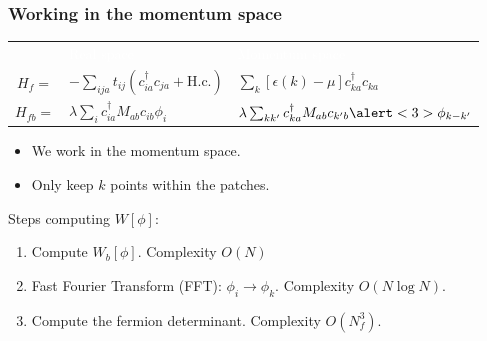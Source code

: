 \documentclass[xcolor=table, 10pt, aspectratio=43]{beamer}
\renewcommand{\arraystretch}{1.5}
\begin{document}
\begin{frame}
  \frametitle{Working in the momentum space}
  \begin{table}
    \renewcommand{\arraystretch}{2.5}
  \begin{tabularx}{\columnwidth}{cxx}
    & \textcolor{white}{Real space}
    & \textcolor{white}{Momentum space}\\
    $H_f = $ & $-\sum_{ija}t_{ij}(c_{ia}^\dagger c_{ja}+\text{H.c.})$
    & $\sum_k[\epsilon(k)-\mu]c_{ka}^\dagger c_{ka}$\\
    $H_{fb} = $
    & $\lambda\sum_ic_{ia}^\dagger M_{ab}c_{ib}\phi_i$
    & $\lambda\sum_{kk^\prime}c_{ka}^\dagger M_{ab}c_{k^\prime b}
    \alert<3>{\phi_{k-k^\prime}}$
  \end{tabularx}
  \end{table}
  \begin{itemize}
    \item We work in the momentum space.
    \item Only keep $k$ points within the patches.
  \end{itemize}
  Steps computing $W[\phi]$:
  \begin{enumerate}
    \item<2-4> Compute $W_b[\phi]$. Complexity $O(N)$
    \item<3-4> Fast Fourier Transform (FFT): $\phi_i\rightarrow\phi_k$. Complexity $O(N\log N)$.
    \item<4-5> Compute the fermion determinant. Complexity $O(N_f^3)$.
  \end{enumerate}
\end{frame}
\end{document}
